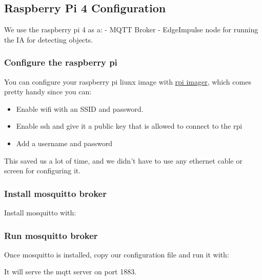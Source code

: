 \subsection{Raspberry Pi 4
Configuration}\label{raspberry-pi-4-configuration}

We use the raspberry pi 4 as a: - MQTT Broker - EdgeImpulse node for
running the IA for detecting objects.

\subsubsection{Configure the raspberry
pi}\label{configure-the-raspberry-pi}

You can configure your raspberry pi liunx image with
\href{https://github.com/raspberrypi/rpi-imager}{rpi imager}, which
comes pretty handy since you can:

\begin{itemize}
\tightlist
\item
  Enable wifi with an SSID and password.
\item
  Enable ssh and give it a public key that is allowed to connect to the
  rpi
\item
  Add a username and password
\end{itemize}

This saved us a lot of time, and we didn't have to use any ethernet
cable or screen for configuring it.

\subsubsection{Install mosquitto broker}\label{install-mosquitto-broker}

Install mosquitto with:

\begin{Shaded}
\begin{Highlighting}[]
\ExtensionTok{$}\KeywordTok{\&\&} 
\ExtensionTok{$}
\end{Highlighting}
\end{Shaded}

\subsubsection{Run mosquitto broker}\label{run-mosquitto-broker}

Once mosquitto is installed, copy our configuration file and run it
with:

\begin{Shaded}
\begin{Highlighting}[]
\ExtensionTok{$}
\end{Highlighting}
\end{Shaded}

It will serve the mqtt server on port 1883.

\subsubsection{}\label{section}
